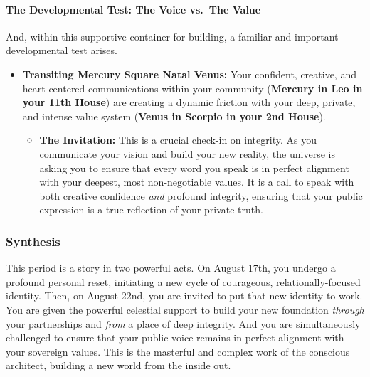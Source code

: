\documentclass{article}
\begin{document}
\paragraph*{The Developmental Test: The Voice vs.~The Value}\label{the-developmental-test-the-voice-vs.-the-value}

And, within this supportive container for building, a familiar and important developmental test arises.

\begin{itemize}
\tightlist
\item
  \textbf{Transiting Mercury Square Natal Venus:} Your confident, creative, and heart-centered communications within your community (\textbf{Mercury in Leo in your 11th House}) are creating a dynamic friction with your deep, private, and intense value system (\textbf{Venus in Scorpio in your 2nd House}).

  \begin{itemize}
  \tightlist
  \item
    \textbf{The Invitation:} This is a crucial check-in on integrity. As you communicate your vision and build your new reality, the universe is asking you to ensure that every word you speak is in perfect alignment with your deepest, most non-negotiable values. It is a call to speak with both creative confidence \emph{and} profound integrity, ensuring that your public expression is a true reflection of your private truth.
  \end{itemize}
\end{itemize}

\subsubsection*{Synthesis}\label{synthesis}

This period is a story in two powerful acts. On August 17th, you undergo a profound personal reset, initiating a new cycle of courageous, relationally-focused identity. Then, on August 22nd, you are invited to put that new identity to work. You are given the powerful celestial support to build your new foundation \emph{through} your partnerships and \emph{from} a place of deep integrity. And you are simultaneously challenged to ensure that your public voice remains in perfect alignment with your sovereign values. This is the masterful and complex work of the conscious architect, building a new world from the inside out.
\end{document}

